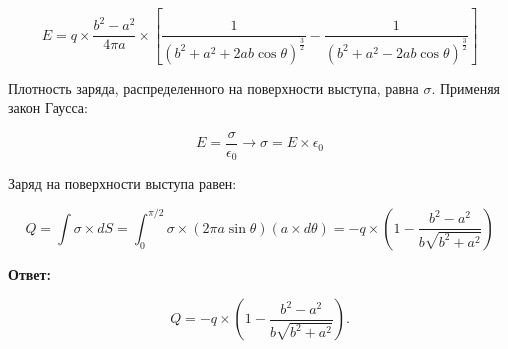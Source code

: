 $$E = q \times \frac{b^2-a^2}{4 \pi a} \times [\frac{1}{(b^2+a^2+2ab\cos{\theta})^\frac{3}{2}}  - \frac{1}{(b^2+a^2-2ab\cos{\theta})^\frac{3}{2}}]$$

Плотность заряда, распределенного на поверхности выступа, равна $\sigma$. Применяя закон Гаусса:

$$E = \frac{\sigma}{\epsilon_0} \rightarrow \sigma = E \times \epsilon_0$$

Заряд на поверхности выступа равен:

$$Q = \displaystyle \int \sigma \times dS = \displaystyle \int_{0}^{\pi/2} \sigma \times (2 \pi a \sin{\theta})(a \times d\theta) = -q \times (1-\frac{b^2-a^2}{b \sqrt{b^2+a^2}})$$

\textbf{Ответ:}

$$Q =  -q \times (1-\frac{b^2-a^2}{b \sqrt{b^2+a^2}}).$$






